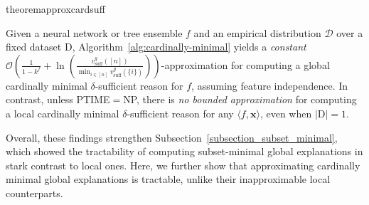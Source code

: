 \documentclass{article}
\newcommand{\x}{\textbf{x}}
\begin{document}
\begin{restatable}{theorem}{approxcardsuff}\label{approx_card_suff_prop}

    Given a neural network or tree ensemble $f$ and an empirical distribution $\mathcal{D}$ over a fixed dataset $\text{D}$, Algorithm~\ref{alg:cardinally-minimal} yields a \emph{constant} $\mathcal{O}\left(\frac{1}{1-k^f}+\ln\left(\frac{v^g_{\text{suff}}([n])}{\min_{i \in [n]} v^g_{\text{suff}}(\{i\})}\right)\right)$-approximation for computing a global cardinally minimal $\delta$-sufficient reason for $f$, assuming feature independence. In contrast, unless PTIME$=$NP, there is \emph{no bounded approximation} for computing a local cardinally minimal $\delta$-sufficient reason for any $\langle f,\x\rangle$, even when $|\text{D}| = 1$.
\end{restatable}


Overall, these findings strengthen Subsection~\ref{subsection_subset_minimal}, which showed the tractability of computing subset-minimal global explanations in stark contrast to local ones. Here, we further show that approximating cardinally minimal global explanations is tractable, unlike their inapproximable local counterparts.



\end{document}
